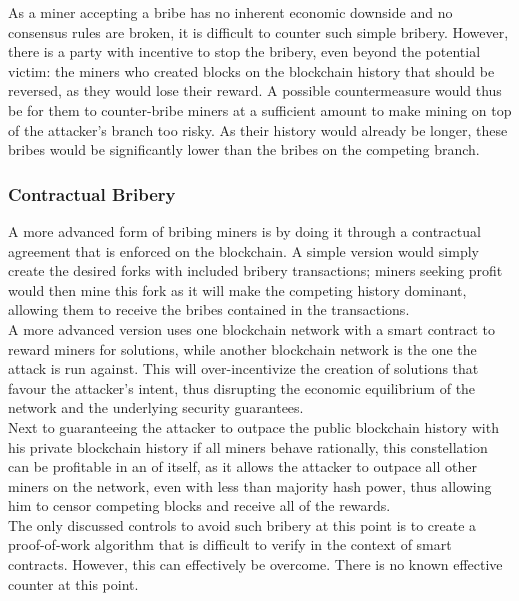 \documentclass[11pt,a4paper]{article}
\begin{document}
As a miner accepting a bribe has no inherent economic downside and no consensus rules are broken, it is difficult to counter such simple bribery. However, there is a party with incentive to stop the bribery, even beyond the potential victim: the miners who created blocks on the blockchain history that should be reversed, as they would lose their reward. A possible countermeasure would thus be for them to counter-bribe miners at a sufficient amount to make mining on top of the attacker's branch too risky. As their history would already be longer, these bribes would be significantly lower than the bribes on the competing branch.\\

\subsubsection{Contractual Bribery}

A more advanced form of bribing miners is by doing it through a contractual agreement that is enforced on the blockchain. A simple version would simply create the desired forks with included bribery transactions; miners seeking profit would then mine this fork as it will make the competing history dominant, allowing them to receive the bribes contained in the transactions.\\

A more advanced version uses one blockchain network with a smart contract to reward miners for solutions, while another blockchain network is the one the attack is run against. This will over-incentivize the creation of solutions that favour the attacker's intent, thus disrupting the economic equilibrium of the network and the underlying security guarantees.\\

Next to guaranteeing the attacker to outpace the public blockchain history with his private blockchain history if all miners behave rationally, this constellation can be profitable in an of itself, as it allows the attacker to outpace all other miners on the network, even with less than majority hash power, thus allowing him to censor competing blocks and receive all of the rewards.\\

The only discussed controls to avoid such bribery at this point is to create a proof-of-work algorithm that is difficult to verify in the context of smart contracts. However, this can effectively be overcome. There is no known effective counter at this point.\\
\end{document}
